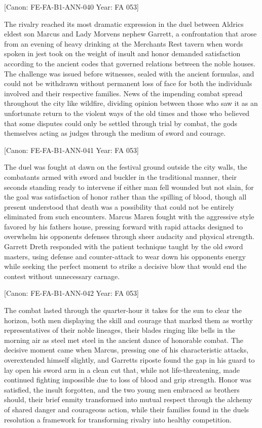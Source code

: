 {[}Canon: FE-FA-B1-ANN-040 \textbar{} Year: FA 053{]}

The rivalry reached its most dramatic expression in the duel between
Aldric\textquotesingle s eldest son Marcus and Lady
Morven\textquotesingle s nephew Garrett, a confrontation that arose from
an evening of heavy drinking at the Merchant\textquotesingle s Rest
tavern when words spoken in jest took on the weight of insult and honor
demanded satisfaction according to the ancient codes that governed
relations between the noble houses. The challenge was issued before
witnesses, sealed with the ancient formulas, and could not be withdrawn
without permanent loss of face for both the individuals involved and
their respective families. News of the impending combat spread
throughout the city like wildfire, dividing opinion between those who
saw it as an unfortunate return to the violent ways of the old times and
those who believed that some disputes could only be settled through
trial by combat, the gods themselves acting as judges through the medium
of sword and courage.

{[}Canon: FE-FA-B1-ANN-041 \textbar{} Year: FA 053{]}

The duel was fought at dawn on the festival ground outside the city
walls, the combatants armed with sword and buckler in the traditional
manner, their seconds standing ready to intervene if either man fell
wounded but not slain, for the goal was satisfaction of honor rather
than the spilling of blood, though all present understood that death was
a possibility that could not be entirely eliminated from such
encounters. Marcus Maren fought with the aggressive style favored by his
father\textquotesingle s house, pressing forward with rapid attacks
designed to overwhelm his opponent\textquotesingle s defenses through
sheer audacity and physical strength. Garrett Dreth responded with the
patient technique taught by the old sword masters, using defense and
counter-attack to wear down his opponent\textquotesingle s energy while
seeking the perfect moment to strike a decisive blow that would end the
contest without unnecessary carnage.

{[}Canon: FE-FA-B1-ANN-042 \textbar{} Year: FA 053{]}

The combat lasted through the quarter-hour it takes for the sun to clear
the horizon, both men displaying the skill and courage that marked them
as worthy representatives of their noble lineages, their blades ringing
like bells in the morning air as steel met steel in the ancient dance of
honorable combat. The decisive moment came when Marcus, pressing one of
his characteristic attacks, overextended himself slightly, and
Garrett\textquotesingle s riposte found the gap in his guard to lay open
his sword arm in a clean cut that, while not life-threatening, made
continued fighting impossible due to loss of blood and grip strength.
Honor was satisfied, the insult forgotten, and the two young men
embraced as brothers should, their brief enmity transformed into mutual
respect through the alchemy of shared danger and courageous action,
while their families found in the duel\textquotesingle s resolution a
framework for transforming rivalry into healthy competition.

